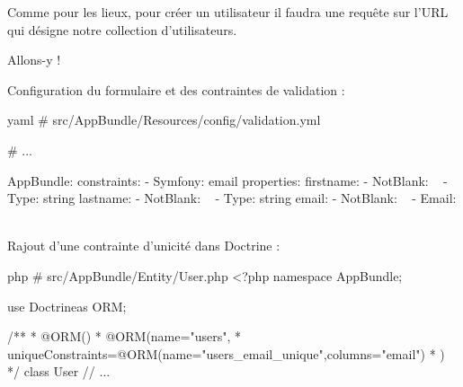 \documentclass[big]{zmdocument}
\begin{document}
Comme pour les lieux, pour créer un utilisateur il faudra une requête  sur l'URL  qui désigne notre collection d'utilisateurs.



Allons-y !



Configuration du formulaire et des contraintes de validation :






\begin{CodeBlock}{yaml}
# src/AppBundle/Resources/config/validation.yml

# ...

AppBundle\Entity\User:
    constraints:
        - Symfony\Bridge\Doctrine\Validator\Constraints\UniqueEntity: email
    properties:
        firstname:
            - NotBlank: ~
            - Type: string
        lastname:
            - NotBlank: ~
            - Type: string
        email:
            - NotBlank: ~
            - Email: ~
\end{CodeBlock}



Rajout d'une contrainte d'unicité dans Doctrine :



\begin{CodeBlock}{php}
# src/AppBundle/Entity/User.php
<?php
namespace AppBundle\Entity;

use Doctrine\ORM\Mapping as ORM;

/**
* @ORM\Entity()
* @ORM\Table(name="users",
*      uniqueConstraints={@ORM\UniqueConstraint(name="users_email_unique",columns={"email"})}
* )
*/
class User
{
    // ...
}
\end{CodeBlock}
\end{document}

